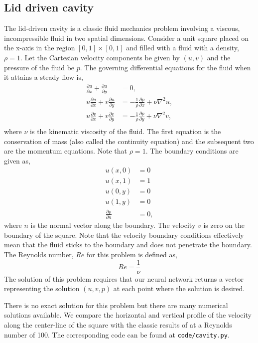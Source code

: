 \documentclass[12pt]{article}
\newcommand{\code}[1]{\lstinline{#1}}
\begin{document}
\subsection{Lid driven cavity}
The lid-driven cavity is a classic fluid mechanics problem involving a viscous, incompressible fluid in two spatial dimensions.  Consider a unit square placed on the x-axis in the region $[0, 1] \times [0, 1]$ and filled with a fluid with a density, $\rho=1$.   Let the Cartesian velocity components be given by $(u, v)$ and the pressure of the fluid be $p$.  The governing differential equations for the fluid when it attains a steady flow is,
\begin{displaymath}
\begin{split}
\frac{\partial u}{\partial x} + \frac{\partial u}{\partial y} &= 0, \\
u \frac{\partial u}{\partial x} + v \frac{\partial u}{\partial y} &= -\frac{1}{\rho} \frac{\partial p}{\partial x} + \nu \nabla^2 u,\\
u \frac{\partial v}{\partial x} + v \frac{\partial v}{\partial y} &= -\frac{1}{\rho} \frac{\partial p}{\partial y} + \nu \nabla^2 v,\\
\end{split}
\end{displaymath}
where $\nu$ is the kinematic viscosity of the fluid.  The first equation is the conservation of mass (also called the continuity equation) and the subsequent two are the momentum equations.  Note that $\rho=1$.
The boundary conditions are given as,
\begin{displaymath}
\begin{split}
    u(x, 0) &= 0\\
    u(x, 1) &= 1\\
    u(0, y) &= 0 \\
    u(1, y) &= 0 \\
    \frac{\partial p}{\partial n} &= 0,
\end{split}
\end{displaymath}
where $n$ is the normal vector along the boundary. The velocity $v$ is zero on the boundary of the square.  Note that the velocity boundary conditions effectively mean that the fluid sticks to the boundary and does not penetrate the boundary. The Reynolds number, $Re$ for this problem is defined as,
\begin{displaymath}
Re = \frac{1}{\nu}
\end{displaymath}
The solution of this problem requires that our neural network returns a vector representing the solution $(u, v, p)$ at each point where the solution is desired.

There is no exact solution for this problem but there are many numerical solutions available.  We compare the horizontal and vertical profile of the velocity along the center-line of the square with the classic results of \cite{ldc:ghia} at a Reynolds number of 100.  The corresponding code can be found at \code{code/cavity.py}.
\end{document}
